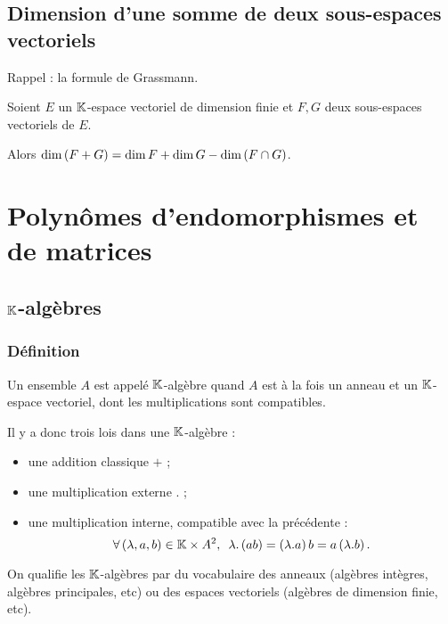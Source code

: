 \subsection{Dimension d'une somme de deux sous-espaces vectoriels}

Rappel : la formule de Grassmann.

\begin{prop}
Soient \(E\) un \(\mathbb{K}\)-espace vectoriel de dimension finie et \(F,G\) deux sous-espaces vectoriels de \(E\).

Alors \(\dim\left(F+G\right)=\dim F+\dim G-\dim\left(F\cap G\right)\).
\end{prop}

\section{Polynômes d'endomorphismes et de matrices}

\subsection{\(\mathbb{K}\)-algèbres}

\subsubsection{Définition}

\begin{defi}
Un ensemble \(A\) est appelé \(\mathbb{K}\)-algèbre quand \(A\) est à la fois un anneau et un \(\mathbb{K}\)-espace vectoriel, dont les multiplications sont compatibles.

Il y a donc trois lois dans une \(\mathbb{K}\)-algèbre :

\begin{itemize}
    \item une addition classique \(+\) ; \\
    \item une multiplication externe \(.\) ; \\
    \item une multiplication interne, compatible avec la précédente : \[\quantifs{\forall\paren{\lambda,a,b}\in\K\times A^2}\lambda.\paren{ab}=\paren{\lambda.a}b=a\paren{\lambda.b}.\]
\end{itemize}
\end{defi}

On qualifie les \(\mathbb{K}\)-algèbres par du vocabulaire des anneaux (algèbres intègres, algèbres principales, etc) ou des espaces vectoriels (algèbres de dimension finie, etc).

